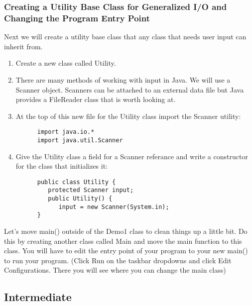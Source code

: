 \documentclass[../../main.tex]{subfiles}
\begin{document}
\begin{steps}
\subsubsection
{Creating a Utility Base Class for Generalized I/O and Changing the Program Entry Point}
      \item Next we will create a utility base class that any class that needs user input
         can inherit from.
   \begin{enumerate}[label=\Alph*.]
      \item Create a new class called Utility.
      \item There are many methods of working with input in Java. We will use a Scanner object.
         Scanners can be attached to an external data file but Java provides a FileReader class
         that is worth looking at.
      \item At the top of this new file for the Utility class import the Scanner utility:
         \begin{verbatim}
      import java.io.* 
      import java.util.Scanner
         \end{verbatim}
      \item Give the Utility class a field for a Scanner referance and write a constructor
         for the class that initializes it:
         \begin{verbatim}
      public class Utility {
         protected Scanner input;
         public Utility() {
            input = new Scanner(System.in);
      }
         \end{verbatim}
   \end{enumerate}
      \item Let's move main() outside of the Demo1 class to clean things up a little bit.
         Do this by creating another class called Main and move the main function to
         this class. You will have to edit the entry point of your program to your new main()
         to run your program. (Click Run on the taskbar dropdowns and click Edit Configurations.
         There you will see where you can change the main class)
   \end{steps}
\subsection{Intermediate}
\end{document}

